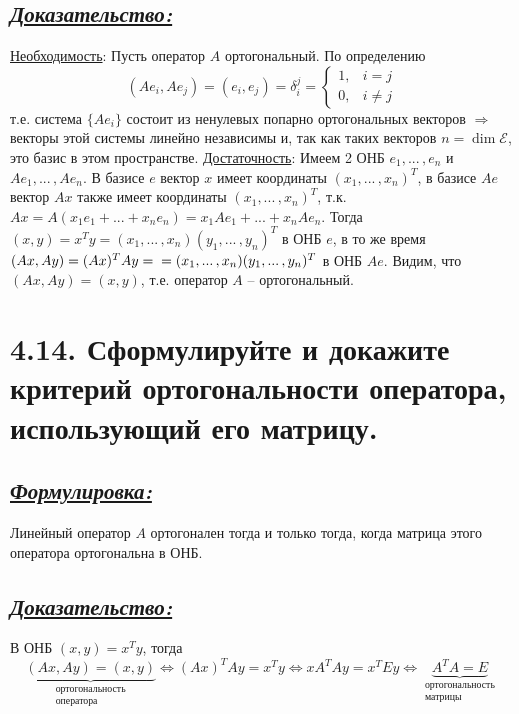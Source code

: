 \documentclass{article}
\begin{document}
\subsection*{\Large \underline{\textit{Доказательство: }}}
\underline{Необходимость}:
\newline Пусть оператор $A$ ортогональный. По определению $$(Ae_i, Ae_j) = (e_i, e_j) = \delta_i^j = \begin{cases}1, & i = j \\ 0, & i \ne j \end{cases}$$ т.е. система $\{Ae_i\}$ состоит из ненулевых попарно ортогональных векторов $\Rightarrow$ векторы этой системы линейно независимы и, так как таких векторов $n = \dim{\mathcal{E}}$, это базис в этом пространстве.
\newline \underline{Достаточность}:
\newline Имеем 2 ОНБ $e_1, ...\,, e_n$ и $Ae_1, ...\,, Ae_n$. В базисе $e$ вектор $x$ имеет координаты $(x_1, ...\,, x_n)^T$, в базисе $Ae$ вектор $Ax$ также имеет координаты $(x_1, ...\,, x_n)^T$, т.к. $Ax = A(x_1e_1 + ... + x_ne_n) = x_1Ae_1 + ... + x_nAe_n$. Тогда $(x, y) = x^Ty = (x_1, ...\,, x_n)(y_1, ...\,,y_n)^T$ в ОНБ $e$, в то же время $(Ax, Ay) = (Ax)^TAy = 
\newline = (x_1, ...\,, x_n)(y_1, ...\,,y_n)^T$ в ОНБ $Ae$. Видим, что $(Ax, Ay) = (x, y)$, т.е. оператор $A$ -- ортогональный.

\section*{\LARGE 4.14. Сформулируйте и докажите критерий ортогональности оператора, использующий его матрицу. }
\subsection*{\Large \underline{\textit{Формулировка: }}}
Линейный оператор $A$ ортогонален тогда и только тогда, когда матрица этого оператора ортогональна в ОНБ.

\subsection*{\Large \underline{\textit{Доказательство: }}}
В ОНБ $(x, y) = x^Ty$, тогда
$$\underbrace{(Ax, Ay) = (x, y)}_{\substack{\text{ортогональность} \\ \text{оператора}}} \Leftrightarrow (Ax)^TAy = x^Ty \Leftrightarrow xA^TAy = x^TEy \Leftrightarrow \underbrace{A^TA = E}_{\substack{\text{ортогональность} \\ \text{матрицы}}}$$
\end{document}
